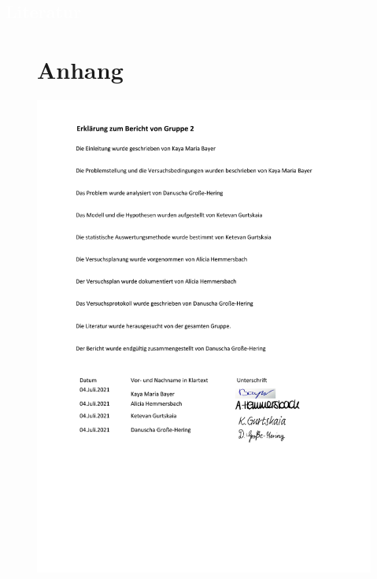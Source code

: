 \documentclass[ ngerman, fontsize= 12pt, paper=a4, headings=big, titlepage=true]{article}
\begin{document}
\newpage
\textcolor{white}{\section{Literatur}}
 

 
 \newpage


\begin{figure}[h]
	\section{Anhang}
	\hspace{-2.3cm}
	\includegraphics[scale=0.8]{ErklaerungzumBericht}
\end{figure}	
\end{document}
